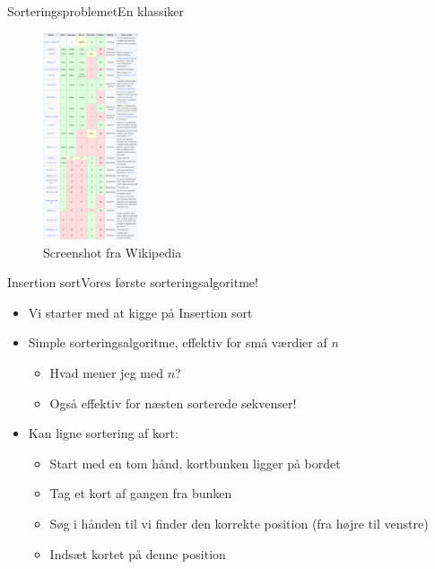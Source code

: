 \documentclass{beamer}
\begin{document}
\begin{frame}{Sorteringsproblemet}{En klassiker}
    \begin{figure}[h]
        \centering
        \includegraphics[width=0.25\textwidth]{sorting-algorithms-wiki}
        \caption{Screenshot fra Wikipedia}
        \label{fig:sorting-algorithms-wiki}
    \end{figure}
\end{frame}

\begin{frame}{Insertion sort}{Vores første sorteringsalgoritme!}
    \begin{itemize}
        \item Vi starter med at kigge på \alert{Insertion sort}
        \item Simple sorteringsalgoritme, effektiv for små værdier af $n$
            \begin{itemize}
                \item Hvad mener jeg med $n$?
                \item Også effektiv for \alert{næsten sorterede} sekvenser!
            \end{itemize}
        \item Kan ligne sortering af kort:
            \begin{itemize}
                \item Start med en tom hånd, kortbunken ligger på bordet
                \item Tag et kort af gangen fra bunken
                \item Søg i hånden til vi finder den korrekte position (fra
                    højre til venstre)
                \item Indsæt kortet på denne position
            \end{itemize}
    \end{itemize}
\end{frame}
\end{document}
